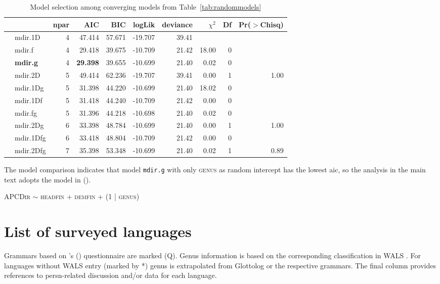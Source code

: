 \documentclass[A4paper]{article}
\newcommand{\citeapos}[1]{\citeauthor{#1}'s (\citeyear{#1})} %
\begin{document}
\begin{table}[htb!]
\centering
\caption{Model selection among converging models from Table~\ref{tab:randommodels} \label{tab:modelselect}}
\begin{tabular}{llrrrrrrrr}
  &	& npar & AIC & BIC & logLik & deviance & $\chi^2$ & Df & Pr($>$Chisq) \\ 
  \midrule
	& mdir.1D   & 4 & 47.414 & 57.671 & -19.707 & 39.41 &  &  &  \\ 
	& mdir.f    & 4 & 29.418 & 39.675 & -10.709 & 21.42 & 18.00 & 0 &  \\ 
\HandRight	& \textbf{mdir.g}    & 4 & \textbf{29.398} & 39.655 & -10.699 & 21.40 & 0.02 & 0 &  \\ 
	& mdir.2D   & 5 & 49.414 & 62.236 & -19.707 & 39.41 & 0.00 & 1 & 1.00 \\ 
	& mdir.1Dg  & 5 & 31.398 & 44.220 & -10.699 & 21.40 & 18.02 & 0 &  \\ 
	& mdir.1Df  & 5 & 31.418 & 44.240 & -10.709 & 21.42 & 0.00 & 0 &  \\ 
	& mdir.fg   & 5 & 31.396 & 44.218 & -10.698 & 21.40 & 0.02 & 0 &  \\ 
	& mdir.2Dg  & 6 & 33.398 & 48.784 & -10.699 & 21.40 & 0.00 & 1 & 1.00 \\ 
	& mdir.1Dfg & 6 & 33.418 & 48.804 & -10.709 & 21.42 & 0.00 & 0 &  \\ 
	& mdir.2Dfg & 7 & 35.398 & 53.348 & -10.699 & 21.40 & 0.02 & 1 & 0.89 \\ 
\end{tabular}
\end{table}

The model comparison indicates that model \texttt{mdir.g} with only \textsc{genus} as random intercept has the lowest \gls{aic}, so the analysis in the main text adopts the model in (\nextx).

\ex \textsc{APCDir} $\sim$ \textsc{headfin} + \textsc{demfin}  + (1 | \textsc{genus}) \xe



\section{List of surveyed languages}

Grammars based on \citeapos{comriesmith1977} questionnaire are marked (Q). Genus information is based on the corresponding classification in WALS \citep{wals}. For languages without WALS entry (marked by *) genus is extrapolated from Glottolog \citep{glottolog4.5} or the respective grammars. The final column provides references to \gls{persn}-related discussion and/or data for each language. 
\end{document}
